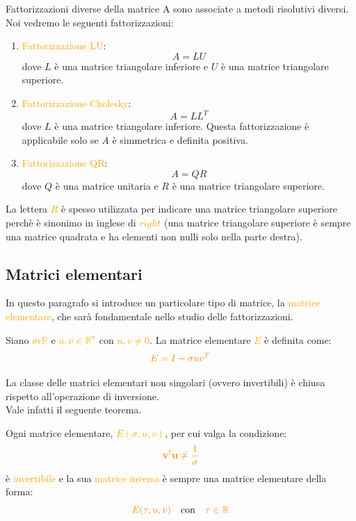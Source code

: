 Fattorizzazioni diverse della matrice A sono associate a metodi risolutivi diversi. \\
Noi vedremo le seguenti fattorizzazioni:
\begin{enumerate}
\item \textcolor{orange}{Fattorizzazione LU}: \[A = LU\] dove $L$ è una matrice triangolare inferiore e $U$ è una matrice triangolare superiore.
\item \textcolor{orange}{Fattorizzazione Cholesky}: \[A = LL^T\] dove $L$ è una matrice triangolare inferiore.
 Questa fattorizzazione è applicabile solo se $A$ è simmetrica e definita positiva.
\item \textcolor{orange}{Fattorizzazione QR}: \[A = QR\] dove $Q$ è una matrice unitaria e $R$ è una matrice triangolare superiore.
\end{enumerate}

\begin{obs}
La lettera \textcolor{orange}{$R$} è spesso utilizzata per indicare una matrice triangolare superiore perchè è sinonimo in inglese
di \textcolor{orange}{$right$} (una matrice triangolare superiore è sempre una matrice quadrata e ha elementi non nulli solo nella parte destra).
\end{obs}

\subsection{Matrici elementari}

In questo paragrafo si introduce un particolare tipo di matrice, la \textcolor{orange}{matrice elementare}, che
sarà fondamentale nello studio delle fattorizzazioni.

\begin{defi}
Siano \textcolor{orange}{$\sigma \epsilon \mathbb{R}$} e \textcolor{orange}{$u, v \in \mathbb{R}^n$} con \textcolor{orange}{$u, v \neq 0$}.
 La matrice elementare \textcolor{orange}{$E$} è definita come:
\[\textcolor{orange}{E = I - \sigma uv^T}\]
\end{defi}

La classe delle matrici elementari non singolari (ovvero invertibili) è chiusa rispetto all'operazione di inversione.\\
Vale infatti il seguente teorema.

\begin{theorem}\label{teorema:inversione_elementare}
    Ogni matrice elementare, \textcolor{orange}{$E(\sigma, u, v)$}, per cui valga la condizione:
    \[ 
    \textcolor{orange}{\textbf{v}^t \textbf{u} \neq \frac{1}{\sigma}}
    \]
    è \textcolor{orange}{invertibile} e la sua \textcolor{orange}{matrice inversa} è sempre una matrice elementare della forma:
    \[\textcolor{orange}{E(\tau, u, v)} \quad \text{con} \quad \textcolor{orange}{\tau \in \mathbb{R}}\]
\end{theorem}

